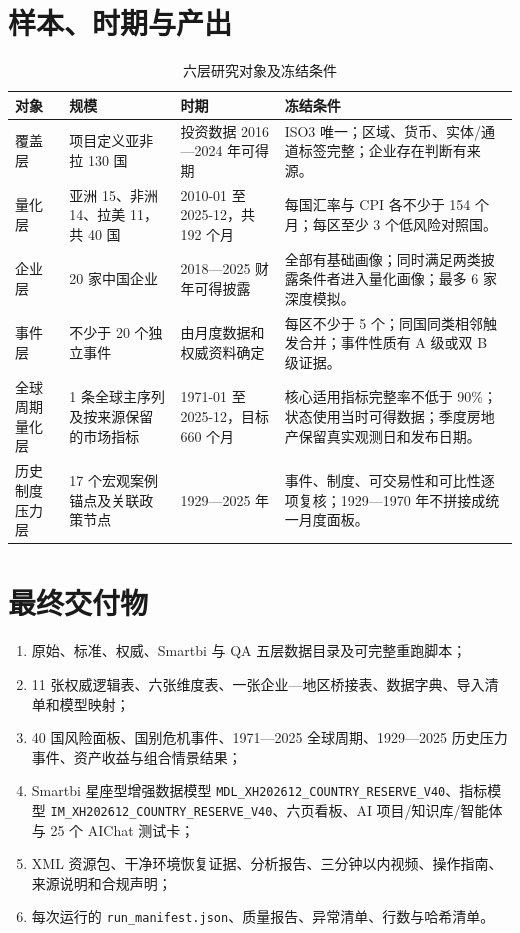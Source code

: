 \documentclass[UTF8,fontset=windows,12pt,openany]{ctexbook}
\newcommand{\Field}[1]{{\small\nolinkurl{#1}}}
\newcommand{\File}[1]{{\small\nolinkurl{#1}}}
\begin{document}
\section{样本、时期与产出}

\begin{longtable}{p{3.1cm}p{3.2cm}p{3.0cm}p{4.5cm}}
\caption{六层研究对象及冻结条件}\label{tab:sample-contract}\\
\toprule
\textbf{对象} & \textbf{规模} & \textbf{时期} & \textbf{冻结条件}\\
\midrule
覆盖层 & 项目定义亚非拉 130 国 & 投资数据 2016—2024 年可得期 & ISO3 唯一；区域、货币、实体/通道标签完整；企业存在判断有来源。\\
量化层 & 亚洲 15、非洲 14、拉美 11，共 40 国 & 2010-01 至 2025-12，共 192 个月 & 每国汇率与 CPI 各不少于 154 个月；每区至少 3 个低风险对照国。\\
企业层 & 20 家中国企业 & 2018—2025 财年可得披露 & 全部有基础画像；同时满足两类披露条件者进入量化画像；最多 6 家深度模拟。\\
事件层 & 不少于 20 个独立事件 & 由月度数据和权威资料确定 & 每区不少于 5 个；同国同类相邻触发合并；事件性质有 A 级或双 B 级证据。\\
全球周期量化层 & 1 条全球主序列及按来源保留的市场指标 & 1971-01 至 2025-12，目标 660 个月 & 核心适用指标完整率不低于 90\%；状态使用当时可得数据；季度房地产保留真实观测日和发布日期。\\
历史制度压力层 & 17 个宏观案例锚点及关联政策节点 & 1929—2025 年 & 事件、制度、可交易性和可比性逐项复核；1929—1970 年不拼接成统一月度面板。\\
\bottomrule
\end{longtable}

\section{最终交付物}

\begin{enumerate}
  \item 原始、标准、权威、Smartbi 与 QA 五层数据目录及可完整重跑脚本；
  \item 11 张权威逻辑表、六张维度表、一张企业—地区桥接表、数据字典、导入清单和模型映射；
  \item 40 国风险面板、国别危机事件、1971—2025 全球周期、1929—2025 历史压力事件、资产收益与组合情景结果；
  \item Smartbi 星座型增强数据模型 \Field{MDL_XH202612_COUNTRY_RESERVE_V40}、指标模型 \Field{IM_XH202612_COUNTRY_RESERVE_V40}、六页看板、AI 项目/知识库/智能体与 25 个 AIChat 测试卡；
  \item XML 资源包、干净环境恢复证据、分析报告、三分钟以内视频、操作指南、来源说明和合规声明；
  \item 每次运行的 \File{run_manifest.json}、质量报告、异常清单、行数与哈希清单。
\end{enumerate}
\end{document}
